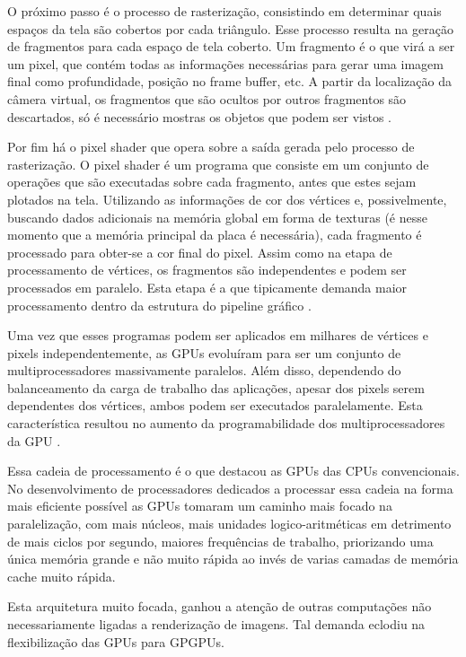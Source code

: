   O próximo passo é o processo de rasterização, consistindo em determinar quais espaços da tela são cobertos por cada triângulo. Esse processo resulta na geração de fragmentos para cada espaço de tela coberto. Um fragmento é o que virá a ser um pixel, que contém todas as informações necessárias para gerar uma imagem final como profundidade, posição no frame buffer, etc. A partir da localização da câmera virtual, os fragmentos que são ocultos por outros fragmentos são descartados, só é necessário mostras os objetos que podem ser vistos \citep{gpu-comp:08}.

  Por fim há o pixel shader que opera sobre a saída gerada pelo processo de rasterização. O pixel shader é um programa que consiste em um conjunto de operações que são executadas sobre cada fragmento, antes que estes sejam plotados na tela. Utilizando as informações de cor dos vértices e, possivelmente, buscando dados adicionais na memória global em forma de texturas (é nesse momento que a memória principal da placa é necessária), cada fragmento é processado para obter-se a cor final do pixel. Assim como na etapa de processamento de vértices, os fragmentos são independentes e podem ser processados em paralelo. Esta etapa é a que tipicamente demanda maior processamento dentro da estrutura do pipeline gráfico \citep{gpu-comp:08}.

  Uma vez que esses programas podem ser aplicados em milhares de vértices e pixels independentemente, as GPUs evoluíram para ser um conjunto de multiprocessadores massivamente paralelos. Além disso, dependendo do balanceamento da carga de trabalho das aplicações, apesar dos pixels serem dependentes dos vértices, ambos podem ser executados paralelamente. Esta característica resultou no aumento da programabilidade dos multiprocessadores da GPU \citep{massively:16}.

  Essa cadeia de processamento é o que destacou as GPUs das CPUs convencionais. No desenvolvimento de processadores dedicados a processar essa cadeia na forma mais eficiente possível as GPUs tomaram um caminho mais focado na paralelização, com mais núcleos, mais unidades logico-aritméticas em detrimento de mais ciclos por segundo, maiores frequências de trabalho, priorizando uma única memória grande e não muito rápida ao invés de varias camadas de memória cache muito rápida.

  Esta arquitetura muito focada, ganhou a atenção de outras computações não necessariamente ligadas a renderização de imagens. Tal demanda eclodiu na flexibilização das GPUs para GPGPUs.


